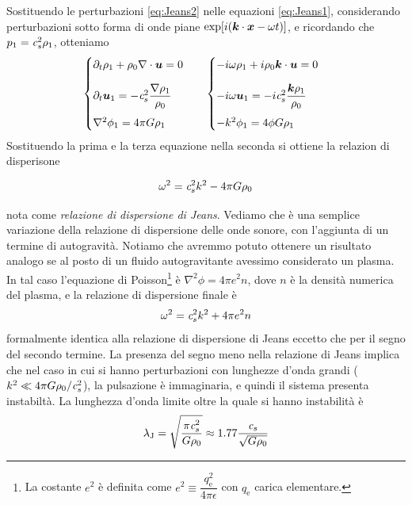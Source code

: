 Sostituendo le perturbazioni \ref{eq:Jeans2} nelle equazioni \ref{eq:Jeans1}, considerando perturbazioni sotto forma di onde piane $\exp [i(\scal{k}{x}-\omega t)]$, e ricordando che $p_1= \textit{c}_{s}^2 \rho_1$, otteniamo
\begin{align*}
&\begin{cases}
\dpt \rho_1 + \rho_0 \scal{\nabla}{u} = 0 \\[10pt]
\dpt \V{u}_1 = - \sound^2 \dfrac{\V{\nabla}\rho_1}{\rho_0} \\[10pt]
\nabla^2 \phi_1 = 4\pi G \rho_1
\end{cases}
&\begin{cases}
-i\omega \rho_1 + i\rho_0 \scal{k}{u} =0 \\[10pt]
-i\omega \V{u}_1 = -i \sound^2 \dfrac{\V{k}\rho_1}{\rho_0} \\[10pt]
-k^2 \phi_1 = 4 \phi G \rho_1
\end{cases}
\end{align*}
Sostituendo la prima e la terza equazione nella seconda si ottiene la relazion di disperisone
\begin{EQ}
\begin{equation}
\omega^2 = \textit{c}_{s}^2 k^2 - 4\pi G \rho_0
\end{equation}
\end{EQ}
nota come \textit{relazione di dispersione di Jeans}. Vediamo che è una semplice variazione della relazione di dispersione delle onde sonore, con l'aggiunta di un termine di autogravità. Notiamo che avremmo potuto ottenere un risultato analogo se al posto di un fluido autogravitante avessimo considerato un plasma. In tal caso l'equazione di Poisson\footnote{La costante $e^2$ è definita come $e^2\equiv \dfrac{q_\mathrm{e}^2}{4 \pi \epsilon}$ con $q_\mathrm{e}$ carica elementare.} è $\nabla^2 \phi = 4\pi e^2 n$, dove $n$ è la densità numerica del plasma, e la relazione di dispersione finale è 
\begin{equation}
\omega^2 = \textit{c}_{s}^2 k^2 + 4\pi e^2 n
\end{equation}
formalmente identica alla relazione di dispersione di Jeans eccetto che per il segno del secondo termine. La presenza del segno meno nella relazione di Jeans implica che nel caso in cui si hanno perturbazioni con lunghezze d'onda grandi ($k^2 \ll 4\pi G \rho_0 /\textit{c}_{s}^2$), la pulsazione è immaginaria, e quindi il sistema presenta instabiltà. La lunghezza d'onda limite oltre la quale si hanno instabilità è
\begin{equation}
\lambda_\mathrm{J} = \sqrt{\dfrac{\pi \textit{c}_{s}^2}{G\rho_0}} \approx 1.77 \dfrac{\textit{c}_{s}}{\sqrt{G\rho_0}}
\end{equation}
